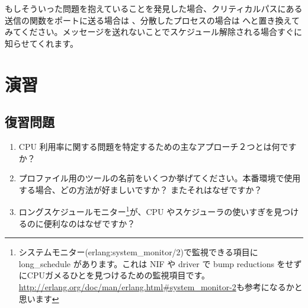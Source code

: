 もしそういった問題を抱えていることを発見した場合、クリティカルパスにある送信の関数をポートに送る場合は 、分散したプロセスの場合は  へと置き換えてみてください。メッセージを送れないことでスケジュール解除される場合すぐに知らせてくれます。

\section{演習}

\subsection*{復習問題}

\begin{enumerate}
	\item CPU 利用率に関する問題を特定するための主なアプローチ２つとは何ですか？
	\item プロファイル用のツールの名前をいくつか挙げてください。本番環境で使用する場合、どの方法が好ましいですか？ またそれはなぜですか？
  \item ロングスケジュールモニター\footnote{システムモニター(erlang:system\_monitor/2)で監視できる項目に long\_schedule があります。これは NIF や driver で bump reductions をせずにCPUガメるひとを見つけるための監視項目です。\href{http://erlang.org/doc/man/erlang.html\#system\_monitor-2}{http://erlang.org/doc/man/erlang.html\#system\_monitor-2}も参考になるかと思います}が、CPU やスケジューラの使いすぎを見つけるのに便利なのはなぜですか？

\end{enumerate}

